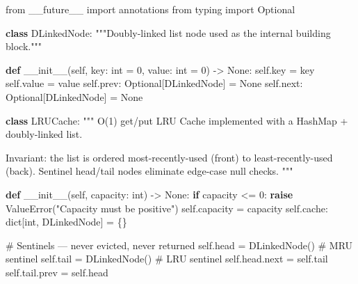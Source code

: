 \documentclass[11pt]{article}
\newenvironment{Shaded}{\begin{snugshade}}{\end{snugshade}}
\newcommand{\BuiltInTok}[1]{\textcolor[rgb]{0.50,0.55,0.55}{#1}}
\newcommand{\CommentTok}[1]{\textcolor[rgb]{0.48,0.49,0.49}{#1}}
\newcommand{\ControlFlowTok}[1]{\textcolor[rgb]{0.99,0.74,0.29}{\textbf{#1}}}
\newcommand{\DecValTok}[1]{\textcolor[rgb]{0.96,0.45,0.00}{#1}}
\newcommand{\FunctionTok}[1]{\textcolor[rgb]{0.56,0.27,0.68}{#1}}
\newcommand{\ImportTok}[1]{\textcolor[rgb]{0.15,0.68,0.38}{#1}}
\newcommand{\KeywordTok}[1]{\textcolor[rgb]{0.81,0.81,0.76}{\textbf{#1}}}
\newcommand{\NormalTok}[1]{\textcolor[rgb]{0.81,0.81,0.76}{#1}}
\newcommand{\OperatorTok}[1]{\textcolor[rgb]{0.81,0.81,0.76}{#1}}
\newcommand{\PreprocessorTok}[1]{\textcolor[rgb]{0.15,0.68,0.38}{#1}}
\newcommand{\StringTok}[1]{\textcolor[rgb]{0.96,0.31,0.31}{#1}}
\newcommand{\VariableTok}[1]{\textcolor[rgb]{0.15,0.68,0.68}{#1}}
\begin{document}
\begin{Shaded}
\begin{Highlighting}[]
\ImportTok{from}\NormalTok{ \_\_future\_\_ }\ImportTok{import}\NormalTok{ annotations}
\ImportTok{from}\NormalTok{ typing }\ImportTok{import}\NormalTok{ Optional}


\KeywordTok{class}\NormalTok{ DLinkedNode:}
    \CommentTok{"""Doubly{-}linked list node used as the internal building block."""}

    \KeywordTok{def} \FunctionTok{\_\_init\_\_}\NormalTok{(}\VariableTok{self}\NormalTok{, key: }\BuiltInTok{int} \OperatorTok{=} \DecValTok{0}\NormalTok{, value: }\BuiltInTok{int} \OperatorTok{=} \DecValTok{0}\NormalTok{) }\OperatorTok{{-}\textgreater{}} \VariableTok{None}\NormalTok{:}
        \VariableTok{self}\NormalTok{.key }\OperatorTok{=}\NormalTok{ key}
        \VariableTok{self}\NormalTok{.value }\OperatorTok{=}\NormalTok{ value}
        \VariableTok{self}\NormalTok{.prev: Optional[DLinkedNode] }\OperatorTok{=} \VariableTok{None}
        \VariableTok{self}\NormalTok{.}\BuiltInTok{next}\NormalTok{: Optional[DLinkedNode] }\OperatorTok{=} \VariableTok{None}


\KeywordTok{class}\NormalTok{ LRUCache:}
    \CommentTok{"""}
\CommentTok{    O(1) get/put LRU Cache implemented with a HashMap + doubly{-}linked list.}

\CommentTok{    Invariant: the list is ordered most{-}recently{-}used (front) to}
\CommentTok{    least{-}recently{-}used (back). Sentinel head/tail nodes eliminate}
\CommentTok{    edge{-}case null checks.}
\CommentTok{    """}

    \KeywordTok{def} \FunctionTok{\_\_init\_\_}\NormalTok{(}\VariableTok{self}\NormalTok{, capacity: }\BuiltInTok{int}\NormalTok{) }\OperatorTok{{-}\textgreater{}} \VariableTok{None}\NormalTok{:}
        \ControlFlowTok{if}\NormalTok{ capacity }\OperatorTok{\textless{}=} \DecValTok{0}\NormalTok{:}
            \ControlFlowTok{raise} \PreprocessorTok{ValueError}\NormalTok{(}\StringTok{"Capacity must be positive"}\NormalTok{)}
        \VariableTok{self}\NormalTok{.capacity }\OperatorTok{=}\NormalTok{ capacity}
        \VariableTok{self}\NormalTok{.cache: }\BuiltInTok{dict}\NormalTok{[}\BuiltInTok{int}\NormalTok{, DLinkedNode] }\OperatorTok{=}\NormalTok{ \{\}}

        \CommentTok{\# Sentinels — never evicted, never returned}
        \VariableTok{self}\NormalTok{.head }\OperatorTok{=}\NormalTok{ DLinkedNode()  }\CommentTok{\# MRU sentinel}
        \VariableTok{self}\NormalTok{.tail }\OperatorTok{=}\NormalTok{ DLinkedNode()  }\CommentTok{\# LRU sentinel}
        \VariableTok{self}\NormalTok{.head.}\BuiltInTok{next} \OperatorTok{=} \VariableTok{self}\NormalTok{.tail}
        \VariableTok{self}\NormalTok{.tail.prev }\OperatorTok{=} \VariableTok{self}\NormalTok{.head}


\end{Highlighting}
\end{Shaded}
\end{document}

